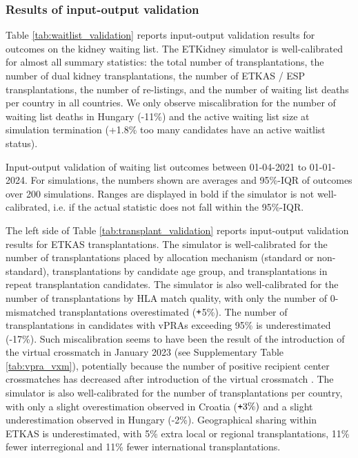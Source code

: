 \subsubsection*{Results of input-output validation}
\label{subsection:val_wl_outc}
Table \ref{tab:waitlist_validation} reports input-output validation results for outcomes on the kidney waiting list. The ETKidney simulator is well-calibrated for almost all summary statistics: the total number of transplantations, the number of dual kidney transplantations, the number of ETKAS / ESP transplantations, the number of re-listings, and the number of waiting list deaths per country in all countries. We only observe miscalibration for the number of waiting list deaths in Hungary (-11\%) and the active waiting list size at simulation termination (+1.8\% too many candidates have an active waitlist status).
\begin{table}[h]
	\caption{Input-output validation of waiting list outcomes between 01-04-2021 to 01-01-2024. For simulations, the numbers shown are averages and 95\%-IQR of outcomes over 200 simulations. Ranges are displayed in bold if the simulator is not well-calibrated, i.e. if the actual statistic does not fall within the 95\%-IQR.}
	
	\label{tab:waitlist_validation}
\end{table}
\par
The left side of Table \ref{tab:transplant_validation} reports input-output validation results for ETKAS transplantations. The simulator is well-calibrated for the number of transplantations placed by allocation mechanism (standard or non-standard), transplantations by candidate age group, and transplantations in repeat transplantation candidates. The simulator is also well-calibrated for the number of transplantations by HLA match quality, with only the number of 0-mismatched transplantations overestimated ($\texttt{+}$5\%). The number of transplantations in candidates with vPRAs exceeding 95\% is underestimated (-17\%). Such miscalibration seems to have been the result of the introduction of the virtual crossmatch in January 2023 (see Supplementary Table \ref{tab:vpra_vxm}), potentially because the number of positive recipient center crossmatches has decreased after introduction of the virtual crossmatch \cite{Heidt2024}. The simulator is also well-calibrated for the number of transplantations per country, with only a slight overestimation observed in Croatia ($\texttt{+} 3\%)$ and a slight underestimation observed in Hungary (-2\%). Geographical sharing within ETKAS is underestimated, with 5\% extra local or regional transplantations, 11\% fewer interregional and 11\% fewer international transplantations.
